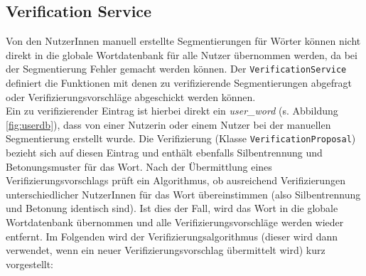 \subsection{Verification Service}
\label{sec:verification-service}

Von den NutzerInnen manuell erstellte Segmentierungen für Wörter können nicht direkt in die globale Wortdatenbank für alle Nutzer übernommen werden, da bei der Segmentierung Fehler gemacht werden können. Der \texttt{VerificationService} definiert die Funktionen mit denen zu verifizierende Segmentierungen abgefragt oder Verifizierungsvorschläge abgeschickt werden können.\\
Ein zu verifizierender Eintrag ist hierbei direkt ein \textit{user\_word} (s. Abbildung \ref{fig:userdb}), dass von einer Nutzerin oder einem Nutzer bei der manuellen Segmentierung erstellt wurde. Die Verifizierung (Klasse \texttt{VerificationProposal}) bezieht sich auf diesen Eintrag und enthält ebenfalls Silbentrennung und Betonungsmuster für das Wort. Nach der Übermittlung eines Verifizierungsvorschlags prüft ein Algorithmus, ob ausreichend Verifizierungen unterschiedlicher NutzerInnen für das Wort übereinstimmen (also Silbentrennung und Betonung identisch sind). Ist dies der Fall, wird das Wort in die globale Wortdatenbank übernommen und alle Verifizierungsvorschläge werden wieder entfernt. Im Folgenden wird der Verifizierungsalgorithmus (dieser wird dann verwendet, wenn ein neuer Verifizierungsvorschlag übermittelt wird) kurz vorgestellt:

